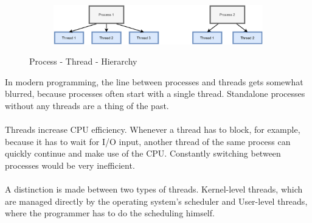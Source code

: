 \begin{figure}[H]
  \centering
  \begin{subfigure}[b]{1.0\textwidth}
    \includegraphics[width=1.0\linewidth]{img/process-thread.png}
  \end{subfigure}
  \caption{Process - Thread - Hierarchy}
  \label{Process - Thread - hierarchy}
\end{figure}
In modern programming, the line between processes and threads gets somewhat blurred, because processes often start with a single thread. Standalone processes without any threads are a thing of the past.
\\
\\
Threads increase CPU efficiency. Whenever a thread has to block, for example, because it has to wait for I/O input, another thread of the same process can quickly continue and make use of the CPU. Constantly switching between processes would be very inefficient.
\\
\\
A distinction is made between two types of threads. Kernel-level threads, which are managed directly by the operating system's scheduler and User-level threads, where the programmer has to do the scheduling himself.\cite{Schoettner:bs18:6.4}

